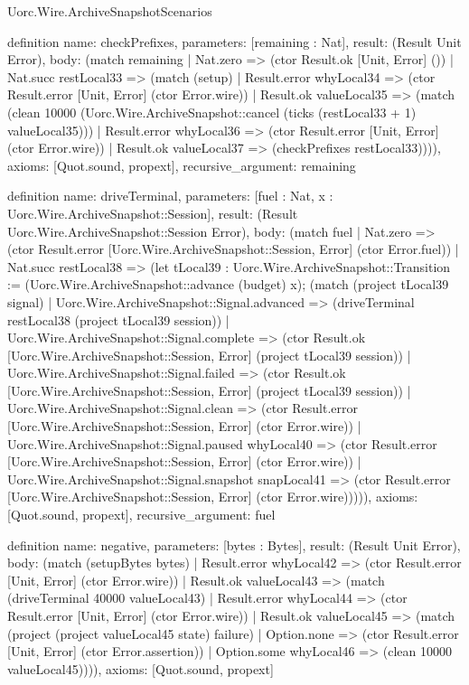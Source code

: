 \begin{lexlean}{Uorc.Wire.ArchiveSnapshotScenarios}
\begin{semanticmodule}
definition{
  name: checkPrefixes,
  parameters: [remaining : Nat],
  result: (Result Unit Error),
  body: (match remaining
    | Nat.zero => (ctor Result.ok [Unit, Error] ())
    | Nat.succ restLocal33 => (match (setup)
      | Result.error whyLocal34 => (ctor Result.error [Unit, Error] (ctor Error.wire))
      | Result.ok valueLocal35 => (match (clean 10000 (Uorc.Wire.ArchiveSnapshot::cancel (ticks (restLocal33 + 1) valueLocal35)))
        | Result.error whyLocal36 => (ctor Result.error [Unit, Error] (ctor Error.wire))
        | Result.ok valueLocal37 => (checkPrefixes restLocal33)))),
  axioms: [Quot.sound, propext],
  recursive_argument: remaining
}

definition{
  name: driveTerminal,
  parameters: [fuel : Nat, x : Uorc.Wire.ArchiveSnapshot::Session],
  result: (Result Uorc.Wire.ArchiveSnapshot::Session Error),
  body: (match fuel
    | Nat.zero => (ctor Result.error [Uorc.Wire.ArchiveSnapshot::Session, Error] (ctor Error.fuel))
    | Nat.succ restLocal38 => (let tLocal39 : Uorc.Wire.ArchiveSnapshot::Transition := (Uorc.Wire.ArchiveSnapshot::advance (budget) x); (match (project tLocal39 signal)
      | Uorc.Wire.ArchiveSnapshot::Signal.advanced => (driveTerminal restLocal38 (project tLocal39 session))
      | Uorc.Wire.ArchiveSnapshot::Signal.complete => (ctor Result.ok [Uorc.Wire.ArchiveSnapshot::Session, Error] (project tLocal39 session))
      | Uorc.Wire.ArchiveSnapshot::Signal.failed => (ctor Result.ok [Uorc.Wire.ArchiveSnapshot::Session, Error] (project tLocal39 session))
      | Uorc.Wire.ArchiveSnapshot::Signal.clean => (ctor Result.error [Uorc.Wire.ArchiveSnapshot::Session, Error] (ctor Error.wire))
      | Uorc.Wire.ArchiveSnapshot::Signal.paused whyLocal40 => (ctor Result.error [Uorc.Wire.ArchiveSnapshot::Session, Error] (ctor Error.wire))
      | Uorc.Wire.ArchiveSnapshot::Signal.snapshot snapLocal41 => (ctor Result.error [Uorc.Wire.ArchiveSnapshot::Session, Error] (ctor Error.wire))))),
  axioms: [Quot.sound, propext],
  recursive_argument: fuel
}

definition{
  name: negative,
  parameters: [bytes : Bytes],
  result: (Result Unit Error),
  body: (match (setupBytes bytes)
    | Result.error whyLocal42 => (ctor Result.error [Unit, Error] (ctor Error.wire))
    | Result.ok valueLocal43 => (match (driveTerminal 40000 valueLocal43)
      | Result.error whyLocal44 => (ctor Result.error [Unit, Error] (ctor Error.wire))
      | Result.ok valueLocal45 => (match (project (project valueLocal45 state) failure)
        | Option.none => (ctor Result.error [Unit, Error] (ctor Error.assertion))
        | Option.some whyLocal46 => (clean 10000 valueLocal45)))),
  axioms: [Quot.sound, propext]
}


\end{semanticmodule}
\end{lexlean}
